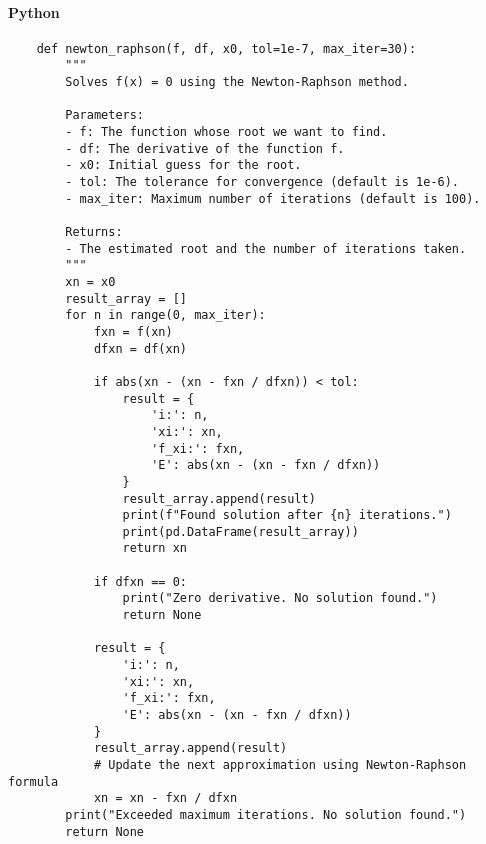 \documentclass{article}
\begin{document}
            \paragraph{Python}
                \begin{verbatim}
    def newton_raphson(f, df, x0, tol=1e-7, max_iter=30):
        """
        Solves f(x) = 0 using the Newton-Raphson method.

        Parameters:
        - f: The function whose root we want to find.
        - df: The derivative of the function f.
        - x0: Initial guess for the root.
        - tol: The tolerance for convergence (default is 1e-6).
        - max_iter: Maximum number of iterations (default is 100).

        Returns:
        - The estimated root and the number of iterations taken.
        """
        xn = x0
        result_array = []
        for n in range(0, max_iter):
            fxn = f(xn)
            dfxn = df(xn)

            if abs(xn - (xn - fxn / dfxn)) < tol:
                result = {
                    'i:': n,
                    'xi:': xn,
                    'f_xi:': fxn,
                    'E': abs(xn - (xn - fxn / dfxn))
                }
                result_array.append(result)
                print(f"Found solution after {n} iterations.")
                print(pd.DataFrame(result_array))
                return xn

            if dfxn == 0:
                print("Zero derivative. No solution found.")
                return None

            result = {
                'i:': n,
                'xi:': xn,
                'f_xi:': fxn,
                'E': abs(xn - (xn - fxn / dfxn))
            }
            result_array.append(result)
            # Update the next approximation using Newton-Raphson formula
            xn = xn - fxn / dfxn
        print("Exceeded maximum iterations. No solution found.")
        return None
                \end{verbatim}
\end{document}

